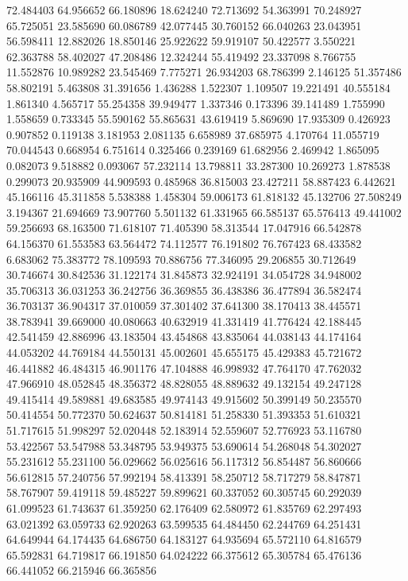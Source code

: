 72.484403
64.956652
66.180896
18.624240
72.713692
54.363991
70.248927
65.725051
23.585690
60.086789
42.077445
30.760152
66.040263
23.043951
56.598411
12.882026
18.850146
25.922622
59.919107
50.422577
3.550221
62.363788
58.402027
47.208486
12.324244
55.419492
23.337098
8.766755
11.552876
10.989282
23.545469
7.775271
26.934203
68.786399
2.146125
51.357486
58.802191
5.463808
31.391656
1.436288
1.522307
1.109507
19.221491
40.555184
1.861340
4.565717
55.254358
39.949477
1.337346
0.173396
39.141489
1.755990
1.558659
0.733345
55.590162
55.865631
43.619419
5.869690
17.935309
0.426923
0.907852
0.119138
3.181953
2.081135
6.658989
37.685975
4.170764
11.055719
70.044543
0.668954
6.751614
0.325466
0.239169
61.682956
2.469942
1.865095
0.082073
9.518882
0.093067
57.232114
13.798811
33.287300
10.269273
1.878538
0.299073
20.935909
44.909593
0.485968
36.815003
23.427211
58.887423
6.442621
45.166116
45.311858
5.538388
1.458304
59.006173
61.818132
45.132706
27.508249
3.194367
21.694669
73.907760
5.501132
61.331965
66.585137
65.576413
49.441002
59.256693
68.163500
71.618107
71.405390
58.313544
17.047916
66.542878
64.156370
61.553583
63.564472
74.112577
76.191802
76.767423
68.433582
6.683062
75.383772
78.109593
70.886756
77.346095
29.206855
30.712649
30.746674
30.842536
31.122174
31.845873
32.924191
34.054728
34.948002
35.706313
36.031253
36.242756
36.369855
36.438386
36.477894
36.582474
36.703137
36.904317
37.010059
37.301402
37.641300
38.170413
38.445571
38.783941
39.669000
40.080663
40.632919
41.331419
41.776424
42.188445
42.541459
42.886996
43.183504
43.454868
43.835064
44.038143
44.174164
44.053202
44.769184
44.550131
45.002601
45.655175
45.429383
45.721672
46.441882
46.484315
46.901176
47.104888
46.998932
47.764170
47.762032
47.966910
48.052845
48.356372
48.828055
48.889632
49.132154
49.247128
49.415414
49.589881
49.683585
49.974143
49.915602
50.399149
50.235570
50.414554
50.772370
50.624637
50.814181
51.258330
51.393353
51.610321
51.717615
51.998297
52.020448
52.183914
52.559607
52.776923
53.116780
53.422567
53.547988
53.348795
53.949375
53.690614
54.268048
54.302027
55.231612
55.231100
56.029662
56.025616
56.117312
56.854487
56.860666
56.612815
57.240756
57.992194
58.413391
58.250712
58.717279
58.847871
58.767907
59.419118
59.485227
59.899621
60.337052
60.305745
60.292039
61.099523
61.743637
61.359250
62.176409
62.580972
61.835769
62.297493
63.021392
63.059733
62.920263
63.599535
64.484450
62.244769
64.251431
64.649944
64.174435
64.686750
64.183127
64.935694
65.572110
64.816579
65.592831
64.719817
66.191850
64.024222
66.375612
65.305784
65.476136
66.441052
66.215946
66.365856
